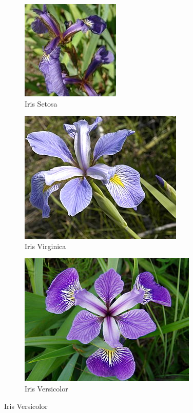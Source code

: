 \documentclass[11pt,a4paper]{article}
\begin{document}
\begin{figure}[h]
  \centering
  \begin{subfigure}[b]{0.17\textwidth}
     \includegraphics[scale=0.5]{img/Iris_setosa_1.jpg}
     \caption{Iris Setosa}
     \label{fig:edge-a}
  \end{subfigure}
  \begin{subfigure}[b]{0.275\textwidth}
     \includegraphics[scale=0.5]{img/Iris_virginica_1.jpg}
     \caption{Iris Virginica}
     \label{fig:contour-b}
  \end{subfigure}
  \begin{subfigure}[b]{0.27\textwidth}
     \includegraphics[scale=1]{img/Iris_versicolor_1.jpg}
     \caption{Iris Versicolor}
     \label{fig:contour-c}
  \end{subfigure}
\end{figure}
\end{document}
